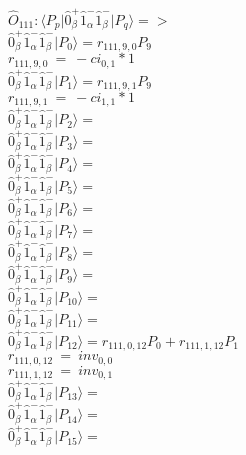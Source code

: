 \documentclass[14pt]{article}
\begin{document}
    $\hat{O}_{111}:  \langle{P_p}\vert \hat{0}_{\beta}^{+}\hat{1}_{\alpha}^{-}\hat{1}_{\beta}^{-} \vert{P_q}\rangle => $ \\ 
    $ \hat{0}_{\beta}^{+}\hat{1}_{\alpha}^{-}\hat{1}_{\beta}^{-} \vert{P_{0}}\rangle = {r}_{111,9,0}P_{9} $ \\ 
    ${r}_{111,9,0}\ =\ -{ci}_{0,1}*1 $ \\ 
    $ \hat{0}_{\beta}^{+}\hat{1}_{\alpha}^{-}\hat{1}_{\beta}^{-} \vert{P_{1}}\rangle = {r}_{111,9,1}P_{9} $ \\ 
    ${r}_{111,9,1}\ =\ -{ci}_{1,1}*1 $ \\ 
    $ \hat{0}_{\beta}^{+}\hat{1}_{\alpha}^{-}\hat{1}_{\beta}^{-} \vert{P_{2}}\rangle =  $ \\ 
    $ \hat{0}_{\beta}^{+}\hat{1}_{\alpha}^{-}\hat{1}_{\beta}^{-} \vert{P_{3}}\rangle =  $ \\ 
    $ \hat{0}_{\beta}^{+}\hat{1}_{\alpha}^{-}\hat{1}_{\beta}^{-} \vert{P_{4}}\rangle =  $ \\ 
    $ \hat{0}_{\beta}^{+}\hat{1}_{\alpha}^{-}\hat{1}_{\beta}^{-} \vert{P_{5}}\rangle =  $ \\ 
    $ \hat{0}_{\beta}^{+}\hat{1}_{\alpha}^{-}\hat{1}_{\beta}^{-} \vert{P_{6}}\rangle =  $ \\ 
    $ \hat{0}_{\beta}^{+}\hat{1}_{\alpha}^{-}\hat{1}_{\beta}^{-} \vert{P_{7}}\rangle =  $ \\ 
    $ \hat{0}_{\beta}^{+}\hat{1}_{\alpha}^{-}\hat{1}_{\beta}^{-} \vert{P_{8}}\rangle =  $ \\ 
    $ \hat{0}_{\beta}^{+}\hat{1}_{\alpha}^{-}\hat{1}_{\beta}^{-} \vert{P_{9}}\rangle =  $ \\ 
    $ \hat{0}_{\beta}^{+}\hat{1}_{\alpha}^{-}\hat{1}_{\beta}^{-} \vert{P_{10}}\rangle =  $ \\ 
    $ \hat{0}_{\beta}^{+}\hat{1}_{\alpha}^{-}\hat{1}_{\beta}^{-} \vert{P_{11}}\rangle =  $ \\ 
    $ \hat{0}_{\beta}^{+}\hat{1}_{\alpha}^{-}\hat{1}_{\beta}^{-} \vert{P_{12}}\rangle = {r}_{111,0,12}P_{0}+{r}_{111,1,12}P_{1} $ \\ 
    ${r}_{111,0,12}\ =\ {inv}_{0,0} $ \\ 
    ${r}_{111,1,12}\ =\ {inv}_{0,1} $ \\ 
    $ \hat{0}_{\beta}^{+}\hat{1}_{\alpha}^{-}\hat{1}_{\beta}^{-} \vert{P_{13}}\rangle =  $ \\ 
    $ \hat{0}_{\beta}^{+}\hat{1}_{\alpha}^{-}\hat{1}_{\beta}^{-} \vert{P_{14}}\rangle =  $ \\ 
    $ \hat{0}_{\beta}^{+}\hat{1}_{\alpha}^{-}\hat{1}_{\beta}^{-} \vert{P_{15}}\rangle =  $ \\ 
    
\end{document}
